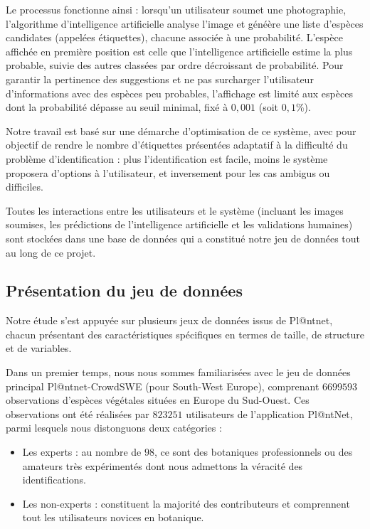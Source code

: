 \documentclass[a4paper,12pt]{article}
\begin{document}
Le processus fonctionne ainsi : lorsqu'un utilisateur soumet une photographie, l'algorithme d'intelligence artificielle analyse l'image et généère une liste d'espèces candidates (appelées étiquettes), chacune associée à une probabilité. L'espèce affichée en première position est celle que l'intelligence artificielle estime la plus probable, suivie des autres classées par ordre décroissant de probabilité. Pour garantir la pertinence des suggestions et ne pas surcharger l'utilisateur d'informations avec des espèces peu probables, l'affichage est limité aux espèces dont la probabilité dépasse au seuil minimal, fixé à $0,001$ (soit $0,1\%$).

\vspace{0.2cm}


Notre travail est basé sur une démarche d'optimisation de ce système, avec pour objectif de rendre le nombre d'étiquettes présentées adaptatif à la difficulté du problème d'identification : plus l'identification est facile, moins le système proposera d'options à l'utilisateur, et inversement pour les cas ambigus ou difficiles.

\vspace{0.2cm}

Toutes les interactions entre les utilisateurs et le système (incluant les images soumises, les prédictions de l'intelligence artificielle et les validations humaines) sont stockées dans une base de données qui a constitué notre jeu de données tout au long de ce projet.


\subsection{Présentation du jeu de données}

Notre étude s'est appuyée sur plusieurs jeux de données issus de Pl@ntnet, chacun présentant des caractéristiques spécifiques en termes de taille, de structure et de variables.

\vspace{0.2cm}

Dans un premier temps, nous nous sommes familiarisées avec le jeu de données principal Pl@ntnet-CrowdSWE (pour South-West Europe), comprenant $\num{6 699 593}$ observations d'espèces végétales situées en Europe du Sud-Ouest. Ces observations ont été réalisées par $\num{823 251}$ utilisateurs de l'application Pl@ntNet, parmi lesquels nous distonguons deux catégories : 
\begin{itemize}
    \item Les experts : au nombre de $98$, ce sont des botaniques professionnels ou des amateurs très expérimentés dont nous admettons la véracité des identifications.
    \item Les non-experts : constituent la majorité des contributeurs et comprennent tout les utilisateurs novices en botanique.
\end{itemize}
\end{document}
